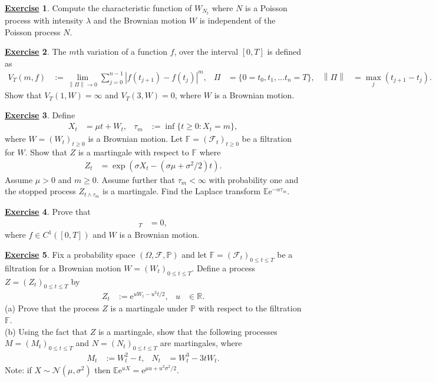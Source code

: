 \documentclass[12pt]{book}
\numberwithin{equation}{chapter}
\theoremstyle{plain}
\numberwithin{theorem}{section}
\theoremstyle{definition}
\newtheorem{exercise}{\underline{Exercise}}
\numberwithin{exercise}{chapter}
\newcommand{\<}{\langle}
\renewcommand{\>}{\rangle}
\renewcommand{\(}{\left(}
\renewcommand{\)}{\right)}
\renewcommand{\[}{\left[}
\renewcommand{\]}{\right]}
\newcommand\Eb{\mathds{E}}
\newcommand\Fb{\mathds{F}}
\newcommand\Pb{\mathds{P}}
\newcommand\Rb{\mathds{R}}
\newcommand\Fc{\mathscr{F}}
\newcommand\Nc{\mathscr{N}}
\newcommand\Om{\Omega}
\newcommand\sig{\sigma}
\newcommand\ee{\mathrm{e}}
\begin{document}
\begin{exercise}
\label{exer:7.2}
Compute the characteristic function of $W_{N_t}$ where $N$ is a Poisson process with intensity $\lambda$ and the Brownian motion $W$ is independent of the Poisson process $N$.
\end{exercise}

\begin{exercise}
\label{exer:7.3}
The $m$th variation of a function $f$, over the interval $[0,T]$ is defined as
\begin{align}
V_T(m,f)
	&:=\lim_{\left\| \Pi \right\| \to 0} \sum_{j=0}^{n-1} | f(t_{j+1}) - f(t_j) |^m , &
\Pi
	&= \{ 0 = t_0, t_1, \ldots t_n = T \} , &
\left\| \Pi \right\|
	&= \max_j ( t_{j+1} - t_j ) .
\end{align}
Show that $V_T(1,W) = \infty$ and $V_T(3,W) = 0$, where $W$ is a Brownian motion.
\end{exercise}

\begin{exercise}
\label{exer:7.4}
Define
\begin{align}
X_t
	&=	\mu t + W_t , &
\tau_m
	&:=	\inf\{ t \geq 0 : X_t = m \} ,
\end{align}
where $W=(W_t)_{t \geq 0}$ is a Brownian motion.
Let $\Fb = (\Fc_t)_{t \geq 0}$ be a filtration for $W$.
Show that $Z$ is a martingale with respect to $\Fb$ where
\begin{align}
Z_t
	&=	\exp \( \sig X_t- (\sig \mu + \sig^2/2) t \) .
\end{align}
Assume $\mu > 0$ and $m \geq 0$.  Assume further that $\tau_m < \infty$ with probability one and the stopped process $Z_{t \wedge \tau_m}$ is a martingale.  Find the Laplace transform $\Eb \ee^{-\alpha \tau_m}$.
\end{exercise}

\begin{exercise}
\label{exer:7.5}
Prove that
\begin{align}
[f,W]_T
	&=	0 ,
\end{align}
where $f \in C^1([0,T])$ and $W$ is a Brownian motion.
\end{exercise}

\begin{exercise}
\label{exer:7.6}
Fix a probability space $(\Om, \Fc, \Pb)$ and let $\Fb = (\Fc_t)_{0 \leq t \leq T}$ be a filtration for a Brownian motion $W = (W_t)_{0 \leq t \leq T}$.  Define a process $Z = (Z_t)_{0 \leq t \leq T}$ by
\begin{align}
Z_t
	&:=	\ee^{u W_t - u^2 t / 2} , &
u
	&\in \Rb .
\end{align}
(a) Prove that the process $Z$ is a martingale under $\Pb$ with respect to the filtration $\Fb$.
\\[0.5em]
(b) Using the fact that $Z$ is a martingale, show that the following processes $M = (M_t)_{0 \leq t \leq T}$ and $N = (N_t)_{0 \leq t \leq T}$ are martingales, where
\begin{align}
M_t
	&:= W_t^2 - t , &
N_t
	&=	W_t^3 - 3 t W_t .
\end{align}
Note: if $X \sim \Nc(\mu,\sig^2)$ then $\Eb \ee^{u X} = \ee^{\mu u + u^2 \sig^2 / 2}$.
\end{exercise}
\end{document}
